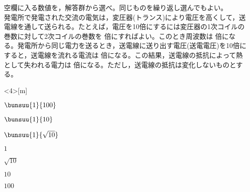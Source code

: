 \hakosyokika
\item 空欄に入る数値を，解答群から選べ。同じものを繰り返し選んでもよい。\\
発電所で発電された交流の電気は，変圧器(トランス)により電圧を高くして，送電線を通して送られる。たとえば，電圧を10倍にするには変圧器の1次コイルの巻数に対して2次コイルの巻数を \Hako 倍にすればよい。このとき周波数は \Hako 倍になる。発電所から同じ電力を送るとき，送電線に送り出す電圧(送電電圧)を10倍にすると，送電線を流れる電流は \Hako 倍になる。この結果，送電線の抵抗によって熱として失われる電力は \Hako 倍になる。ただし，送電線の抵抗は変化しないものとする。\\

\begin{edaenumerate}<4>[m]
    \item $\bunsuu{1}{100}$
    \item $\bunsuu{1}{10}$
    \item $\bunsuu{1}{\sqrt{10}}$
    \item $1$
    \item $\sqrt{10}$
    \item $10$
    \item $100$
\end{edaenumerate}
